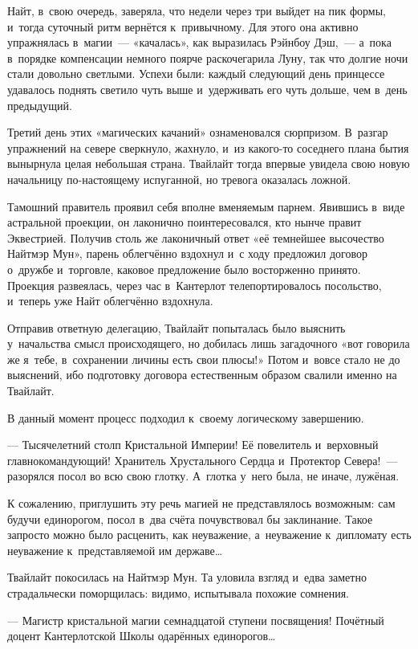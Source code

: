 \documentclass[twoside,a5paper,12pt]{extbook}
\begin{document}
Найт, в свою очередь, заверяла, что недели через три выйдет на пик формы, и тогда суточный ритм вернётся к привычному. Для этого она активно упражнялась в магии — «качалась», как выразилась Рэйнбоу Дэш, — а пока в порядке компенсации немного поярче раскочегарила Луну, так что долгие ночи стали довольно светлыми. Успехи были: каждый следующий день принцессе удавалось поднять светило чуть выше и удерживать его чуть дольше, чем в день предыдущий. 

Третий день этих «магических качаний» ознаменовался сюрпризом. В разгар упражнений на севере сверкнуло, жахнуло, и из какого-то соседнего плана бытия вынырнула целая небольшая страна. Твайлайт тогда впервые увидела свою новую начальницу по-настоящему испуганной, но тревога оказалась ложной.

Тамошний правитель проявил себя вполне вменяемым парнем. Явившись в виде астральной проекции, он лаконично поинтересовался, кто нынче правит Эквестрией. Получив столь же лаконичный ответ «её темнейшее высочество Найтмэр Мун», парень облегчённо вздохнул и с ходу предложил договор о дружбе и торговле, каковое предложение было восторженно принято. Проекция развеялась, через час в Кантерлот телепортировалось посольство, и теперь уже Найт облегчённо вздохнула.

Отправив ответную делегацию, Твайлайт попыталась было выяснить у начальства смысл происходящего, но добилась лишь загадочного «вот говорила же я тебе, в сохранении личины есть свои плюсы!» Потом и вовсе стало не до выяснений, ибо подготовку договора естественным образом свалили именно на Твайлайт.

В данный момент процесс подходил к своему логическому завершению.

— Тысячелетний столп Кристальной Империи! Её повелитель и верховный главнокомандующий! Хранитель Хрустального Сердца и Протектор Севера! — разорялся посол во всю свою глотку. А глотка у него была, не иначе, лужёная.

К сожалению, приглушить эту речь магией не представлялось возможным: сам будучи единорогом, посол в два счёта почувствовал бы заклинание. Такое запросто можно было расценить, как неуважение, а неуважение к дипломату есть неуважение к представляемой им державе…

Твайлайт покосилась на Найтмэр Мун. Та уловила взгляд и едва заметно страдальчески поморщилась: видимо, испытывала похожие сомнения.

— Магистр кристальной магии семнадцатой ступени посвящения! Почётный доцент Кантерлотской Школы одарённых единорогов…
\end{document}
